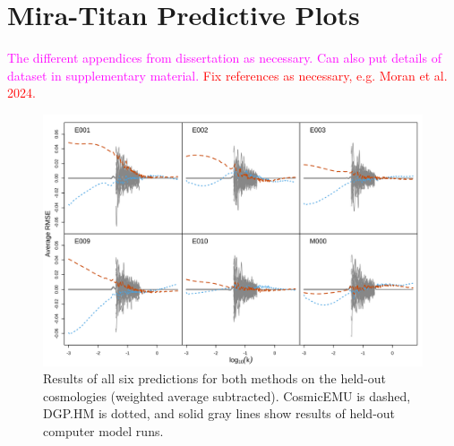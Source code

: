 \documentclass[11pt]{article}
\begin{document}
\section{Mira-Titan Predictive Plots}
\label{sec:apdx_mira_plots}

\textcolor{magenta}{The different appendices from dissertation as necessary. 
Can also put details of dataset in supplementary material.} 
\textcolor{red}{Fix references as necessary, e.g. Moran et al. 2024.}

\begin{figure}[ht]
    \centering
    \includegraphics[width=6in]{pred_1to6.png}
    \caption{Results of all six predictions for both methods on the held-out 
    cosmologies (weighted average subtracted). CosmicEMU is dashed, DGP.HM is dotted, 
    and solid gray lines show results of held-out computer model runs.}
    \label{fig:plot_pred_1to6}
\end{figure}



\end{document}
